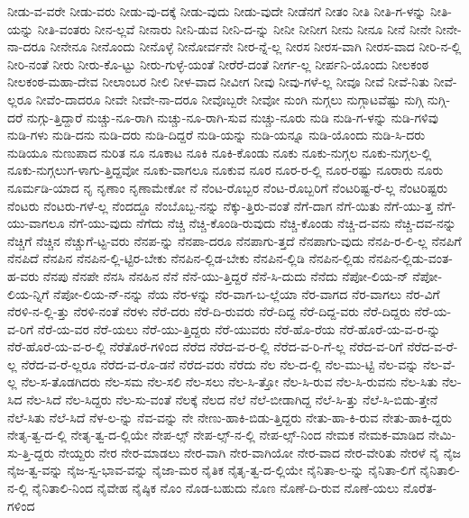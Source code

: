 {ನೀಡು-ವ-ವರೇ
ನೀಡು-ವರು
ನೀಡು-ವು-ದಕ್ಕೆ
ನೀಡು-ವುದು
ನೀಡು-ವುದೇ
ನೀಡೆನಗೆ
ನೀತಂ
ನೀತಿ
ನೀತಿ-ಗ-ಳನ್ನು
ನೀತಿ-ಯನ್ನು
ನೀತಿ-ವಂತರು
ನೀನ-ಲ್ಲವೆ
ನೀನಾರು
ನೀನಿ-ಡುವ
ನೀನಿ-ದ-ನ್ನು
ನೀನೀ
ನೀನೀಗ
ನೀನು
ನೀನೂ
ನೀನೆ
ನೀನೇ
ನೀನೇ-ನಾ-ದರೂ
ನೀನೇನೂ
ನೀನೊಂದು
ನೀನೊಳ್ಳೆ
ನೀನೋರ್ವನೇ
ನೀರ-ನ್ನೆ-ಲ್ಲ
ನೀರಸ
ನೀರಸ-ವಾಗಿ
ನೀರಸ-ವಾದ
ನೀರಿ-ನ-ಲ್ಲಿ
ನೀರಿ-ನಂತೆ
ನೀರು
ನೀರು-ಕೊ-ಟ್ಟು
ನೀರು-ಗುಳ್ಳೆ-ಯಂತೆ
ನೀರೆರೆ-ದಂತೆ
ನೀರ್ಗ-ಲ್ಲ
ನೀರ್ಪನಿ-ಯೊಂದು
ನೀಲಕಂಠ
ನೀಲಕಂಠ-ಮಹಾ-ದೇವ
ನೀಲಾಂಬರ
ನೀಲಿ
ನೀಳ-ವಾದ
ನೀವೀಗ
ನೀವು
ನೀವು-ಗಳೆ-ಲ್ಲ
ನೀವೂ
ನೀವೆ
ನೀವೆ-ನಿತು
ನೀವೆ-ಲ್ಲರೂ
ನೀವೆಂ-ದಾದರೂ
ನೀವೇ
ನೀವೇ-ನಾ-ದರೂ
ನೀವೊಬ್ಬರೇ
ನೀವೋ
ನುಂಗಿ
ನುಗ್ಗಲು
ನುಗ್ಗಾಟವೆಷ್ಟು
ನುಗ್ಗಿ
ನುಗ್ಗಿ-ದರೆ
ನುಗ್ಗು-ತ್ತಿದ್ದಾರೆ
ನುಚ್ಚು-ನೂ-ರಾಗಿ
ನುಚ್ಚು-ನೂ-ರಾಗಿ-ಸುವ
ನುಚ್ಚು-ನೂರು
ನುಡಿ
ನುಡಿ-ಗ-ಳನ್ನು
ನುಡಿ-ಗಳಿವು
ನುಡಿ-ಗಳು
ನುಡಿ-ದನು
ನುಡಿ-ದರು
ನುಡಿ-ದಿದ್ದರೆ
ನುಡಿ-ಯನ್ನು
ನುಡಿ-ಯನ್ನೂ
ನುಡಿ-ಯೊಂದು
ನುಡಿ-ಸಿ-ದರು
ನುಡಿಯೂ
ನುಣುಪಾದ
ನುರಿತ
ನೂ
ನೂಕಾಟ
ನೂಕಿ
ನೂಕಿ-ಕೊಂಡು
ನೂಕು
ನೂಕು-ನುಗ್ಗಲ
ನೂಕು-ನುಗ್ಗಲ-ಲ್ಲಿ
ನೂಕು-ನುಗ್ಗಲುಗ-ಳಾಗು-ತ್ತಿದ್ದವೋ
ನೂಕು-ವಾಗಲೂ
ನೂಕುವ
ನೂರ
ನೂರ-ರ-ಲ್ಲಿ
ನೂರ-ರಷ್ಟು
ನೂರಾರು
ನೂರು
ನೂರ್ಮಡಿ-ಯಾದ
ನೃ
ನೃಣಾಂ
ನೃಣಾಮೇಕೋ
ನೆ
ನೆಂಟ-ರೊಬ್ಬರ
ನೆಂಟ-ರೊಬ್ಬರಿಗೆ
ನೆಂಟರಿಷ್ಟ-ರೆ-ಲ್ಲ
ನೆಂಟರಿಷ್ಟರು
ನೆಂಟರು
ನೆಂಟರು-ಗಳೆ-ಲ್ಲ
ನೆಂದದ್ದೂ
ನೆಂಬೊಬ್ಬ-ನನ್ನು
ನೆಕ್ಕು-ತ್ತಿರು-ವಂತೆ
ನೆಗೆ-ದಾಗ
ನೆಗೆ-ಯಿತು
ನೆಗೆ-ಯು-ತ್ತ
ನೆಗೆ-ಯು-ವಾಗಲೂ
ನೆಗೆ-ಯು-ವುದು
ನೆಗೆದು
ನೆಚ್ಚಿ
ನೆಚ್ಚಿ-ಕೊಂಡಿ-ರುವುದು
ನೆಚ್ಚಿ-ಕೊಂಡು
ನೆಚ್ಚಿ-ದ-ವನು
ನೆಚ್ಚಿ-ದವ-ನನ್ನು
ನೆಚ್ಚಿಗೆ
ನೆಚ್ಚಿನ
ನೆಚ್ಚುಗೆ-ಟ್ಟ-ವರು
ನೆನಪ-ನ್ನು
ನೆನಪಾ-ದರೂ
ನೆನಪಾಗು-ತ್ತದೆ
ನೆನಪಾಗು-ವುದು
ನೆನಪಿ-ರ-ಲಿ-ಲ್ಲ
ನೆನಪಿಗೆ
ನೆನಪಿದೆ
ನೆನಪಿನ
ನೆನಪಿನ-ಲ್ಲಿ-ಟ್ಟಿರ-ಬೇಕು
ನೆನಪಿನ-ಲ್ಲಿಡ-ಬೇಕು
ನೆನಪಿನ-ಲ್ಲಿಡಿ
ನೆನಪಿನ-ಲ್ಲಿಡು
ನೆನಪಿನ-ಲ್ಲಿಡು-ವಂತ-ಹ-ವರು
ನೆನಪು
ನೆನಪೇ
ನೆನಸಿ
ನೆನಹಿನ
ನೆನೆ
ನೆನೆ-ಯು-ತ್ತಿದ್ದರೆ
ನೆನೆ-ಸಿ-ದುದು
ನೆನೆದು
ನೆಪೋ-ಲಿಯ-ನ್
ನೆಪೋ-ಲಿಯ-ನ್ನಿಗೆ
ನೆಪೋ-ಲಿಯ-ನ್-ನನ್ನು
ನೆಯ
ನೆರ-ಳನ್ನು
ನೆರ-ವಾಗ-ಬ-ಲ್ಲೆಯಾ
ನೆರ-ವಾಗದ
ನೆರ-ವಾಗಲು
ನೆರ-ವಿಗೆ
ನೆರಳಿ-ನ-ಲ್ಲಿ-ತ್ತು
ನೆರಳಿ-ನಂತೆ
ನೆರಳು
ನೆರೆ-ದರು
ನೆರೆ-ದಿ-ರುವರು
ನೆರೆ-ದಿದ್ದ
ನೆರೆ-ದಿದ್ದ-ವರು
ನೆರೆ-ದಿದ್ದರು
ನೆರೆ-ಯ-ವ-ರಿಗೆ
ನೆರೆ-ಯ-ವರ
ನೆರೆ-ಯಲು
ನೆರೆ-ಯು-ತ್ತಿದ್ದರು
ನೆರೆ-ಯುವರು
ನೆರೆ-ಹೊ-ರೆಯ
ನೆರೆ-ಹೊರೆ-ಯ-ವ-ರ-ನ್ನು
ನೆರೆ-ಹೊರೆ-ಯ-ವ-ರ-ಲ್ಲಿ
ನೆರೆತೊರೆ-ಗಳಿಂದ
ನೆರೆದ
ನೆರೆದ-ವ-ರ-ಲ್ಲಿ
ನೆರೆದ-ವ-ರಿ-ಗೆ-ಲ್ಲ
ನೆರೆದ-ವ-ರಿಗೆ
ನೆರೆದ-ವ-ರೆ-ಲ್ಲ
ನೆರೆದ-ವ-ರೆ-ಲ್ಲರೂ
ನೆರೆದ-ವ-ರೊ-ಡನೆ
ನೆರೆದ-ವರು
ನೆರೆದು
ನೆಲ
ನೆಲ-ದ-ಲ್ಲಿ
ನೆಲ-ಮು-ಟ್ಟಿ
ನೆಲ-ವನ್ನು
ನೆಲ-ವೆ-ಲ್ಲ
ನೆಲ-ಸ-ತೊಡಗಿದರು
ನೆಲ-ಸಮ
ನೆಲ-ಸಲಿ
ನೆಲ-ಸಲು
ನೆಲ-ಸಿ-ತ್ತೋ
ನೆಲ-ಸಿ-ರುವ
ನೆಲ-ಸಿ-ರುವನು
ನೆಲ-ಸಿತು
ನೆಲ-ಸಿದ
ನೆಲ-ಸಿದೆ
ನೆಲ-ಸಿದ್ದರು
ನೆಲ-ಸು-ವಂತೆ
ನೆಲಕ್ಕೆ
ನೆಲದ
ನೆಲೆ
ನೆಲೆ-ಬೀಡಾಗಿದ್ದ
ನೆಲೆ-ಸಿ-ತ್ತು
ನೆಲೆ-ಸಿ-ಬಿಡು-ತ್ತೇನೆ
ನೆಲೆ-ಸಿತು
ನೆಲೆ-ಸಿದೆ
ನೆಳ-ಲ-ನ್ನು
ನೆವ-ವನ್ನು
ನೇ
ನೇಣು-ಹಾಕಿ-ಬಿಡು-ತ್ತಿದ್ದರು
ನೇತು-ಹಾ-ಕಿ-ರುವ
ನೇತು-ಹಾಕಿ-ದ್ದರು
ನೇತೃ-ತ್ವ-ದ-ಲ್ಲಿ
ನೇತೃ-ತ್ವ-ದ-ಲ್ಲಿಯೇ
ನೇಪ-ಲ್ಸ್
ನೇಪ-ಲ್ಸ್-ನ-ಲ್ಲಿ
ನೇಪ-ಲ್ಸ್-ನಿಂದ
ನೇಮಕ
ನೇಮಕ-ಮಾಡಿದ
ನೇಮಿ-ಸು-ತ್ತಿ-ದ್ದರು
ನೇಯ್ದರು
ನೇರ
ನೇರ-ಮಾಡಲು
ನೇರ-ವಾಗಿ
ನೇರ-ವಾಗಿಯೋ
ನೇರ-ವಾದ
ನೇರ-ವೇರಿತು
ನೇರಳೆ
ನೈ
ನೈಜ
ನೈಜ-ತ್ವ-ವನ್ನು
ನೈಜ-ಸ್ವ-ಭಾವ-ವನ್ನು
ನೈಜಾ-ಮರ
ನೈತಿಕ
ನೈತೃ-ತ್ವ-ದ-ಲ್ಲಿಯೇ
ನೈನಿತಾ-ಲ-ನ್ನು
ನೈನಿತಾ-ಲಿಗೆ
ನೈನಿತಾಲಿ-ನ-ಲ್ಲಿ
ನೈನಿತಾಲಿ-ನಿಂದ
ನೈವೇಹ
ನೈಷ್ಠಿಕ
ನೊಂ
ನೊಡ-ಬಹುದು
ನೊಣ
ನೊಣೆ-ದಿ-ರುವ
ನೊಣೆ-ಯಲು
ನೊರೆತ-ಗಳಿಂದ
}
